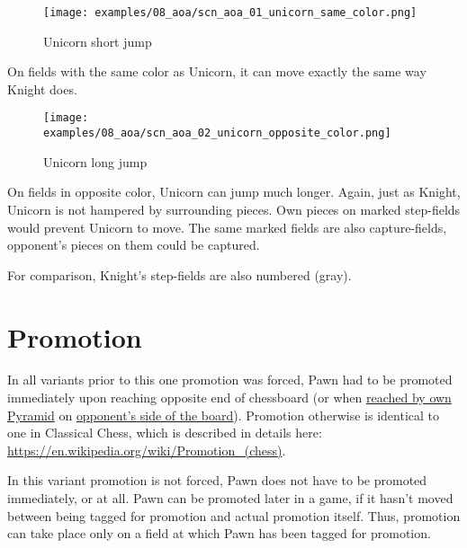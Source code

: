 \noindent
\begin{wrapfigure}{l}{0.4\textwidth}
\centering
\texttt{[image: examples/08\_aoa/scn\_aoa\_01\_unicorn\_same\_color.png]}
\caption{Unicorn short jump}
\label{fig:scn_aoa_01_unicorn_same_color}
\end{wrapfigure}
On fields with the same color as Unicorn, it can move exactly the
same way Knight does.

\clearpage %

\noindent
\begin{figure}[!h]
\texttt{[image: examples/08\_aoa/scn\_aoa\_02\_unicorn\_opposite\_color.png]}
\caption{Unicorn long jump}
\label{fig:scn_aoa_02_unicorn_opposite_color}
\end{figure}

On fields in opposite color, Unicorn can jump much longer. Again, just as
Knight, Unicorn is not hampered by surrounding pieces. Own pieces on marked
step-fields would prevent Unicorn to move. The same marked fields are also
capture-fields, opponent's pieces on them could be captured.

For comparison, Knight's step-fields are also numbered (gray).

\clearpage %

\section*{Promotion}
\label{sec:Age of Aquarius/Promotion}

In all variants prior to this one promotion was forced, Pawn had to be
promoted immediately upon reaching opposite end of chessboard (or when
\hyperref[sec:Mayan Ascendancy/Pyramid/Promotion]{reached by own Pyramid} on
\hyperref[sec:Definitions/Sides of a chessboard]{opponent's side of the board}).
Promotion otherwise is identical to one in Classical Chess, which is
described in details here: \\
\href{https://en.wikipedia.org/wiki/Promotion\_(chess)}{https://en.wikipedia.org/wiki/Promotion\_(chess)}.

In this variant promotion is not forced, Pawn does not have to be promoted
immediately, or at all. Pawn can be promoted later in a game, if it hasn't
moved between being tagged for promotion and actual promotion itself. Thus,
promotion can take place only on a field at which Pawn has been tagged for
promotion.

